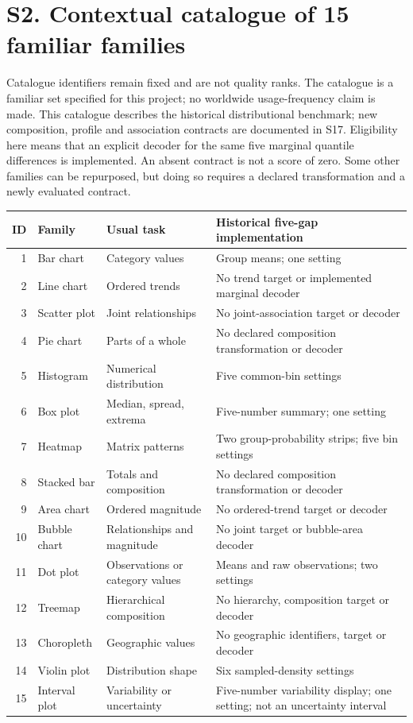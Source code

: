 \documentclass[10pt]{article}
\begin{document}
\section*{S2. Contextual catalogue of 15 familiar families}
Catalogue identifiers remain fixed and are not quality ranks. The catalogue is a familiar set specified for this project; no worldwide usage-frequency claim is made. This catalogue describes the historical distributional benchmark; new composition, profile and association contracts are documented in S17. Eligibility here means that an explicit decoder for the same five marginal quantile differences is implemented. An absent contract is not a score of zero. Some other families can be repurposed, but doing so requires a declared transformation and a newly evaluated contract.
\begin{longtable}{rp{2.7cm}p{4.3cm}p{6.7cm}}\toprule
ID & Family & Usual task & Historical five-gap implementation\\\midrule\endhead
1 & Bar chart & Category values & Group means; one setting\\
2 & Line chart & Ordered trends & No trend target or implemented marginal decoder\\
3 & Scatter plot & Joint relationships & No joint-association target or decoder\\
4 & Pie chart & Parts of a whole & No declared composition transformation or decoder\\
5 & Histogram & Numerical distribution & Five common-bin settings\\
6 & Box plot & Median, spread, extrema & Five-number summary; one setting\\
7 & Heatmap & Matrix patterns & Two group-probability strips; five bin settings\\
8 & Stacked bar & Totals and composition & No declared composition transformation or decoder\\
9 & Area chart & Ordered magnitude & No ordered-trend target or decoder\\
10 & Bubble chart & Relationships and magnitude & No joint target or bubble-area decoder\\
11 & Dot plot & Observations or category values & Means and raw observations; two settings\\
12 & Treemap & Hierarchical composition & No hierarchy, composition target or decoder\\
13 & Choropleth & Geographic values & No geographic identifiers, target or decoder\\
14 & Violin plot & Distribution shape & Six sampled-density settings\\
15 & Interval plot & Variability or uncertainty & Five-number variability display; one setting; not an uncertainty interval\\\bottomrule
\end{longtable}
\end{document}
